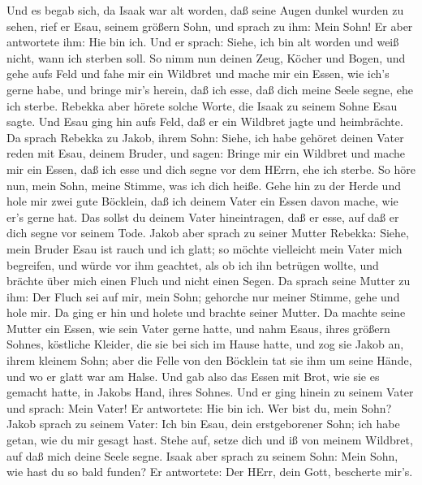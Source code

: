  Und es begab sich, da Isaak war alt worden, daß seine Augen
dunkel wurden zu sehen, rief er Esau, seinem größern Sohn, und sprach zu
ihm: Mein Sohn! Er aber antwortete ihm: Hie bin ich.  Und er
sprach: Siehe, ich bin alt worden und weiß nicht, wann ich sterben soll.
 So nimm nun deinen Zeug, Köcher und Bogen, und gehe aufs
Feld und fahe mir ein Wildbret  und mache mir ein Essen, wie
ich's gerne habe, und bringe mir's herein, daß ich esse, daß dich meine
Seele segne, ehe ich sterbe.  Rebekka aber hörete solche
Worte, die Isaak zu seinem Sohne Esau sagte. Und Esau ging hin aufs
Feld, daß er ein Wildbret jagte und heimbrächte.  Da sprach
Rebekka zu Jakob, ihrem Sohn: Siehe, ich habe gehöret deinen Vater reden
mit Esau, deinem Bruder, und sagen:  Bringe mir ein Wildbret
und mache mir ein Essen, daß ich esse und dich segne vor dem HErrn, ehe
ich sterbe.  So höre nun, mein Sohn, meine Stimme, was ich
dich heiße.  Gehe hin zu der Herde und hole mir zwei gute
Böcklein, daß ich deinem Vater ein Essen davon mache, wie er's gerne
hat.  Das sollst du deinem Vater hineintragen, daß er esse,
auf daß er dich segne vor seinem Tode.  Jakob aber sprach
zu seiner Mutter Rebekka: Siehe, mein Bruder Esau ist rauch und ich
glatt;  so möchte vielleicht mein Vater mich begreifen, und
würde vor ihm geachtet, als ob ich ihn betrügen wollte, und brächte über
mich einen Fluch und nicht einen Segen.  Da sprach seine
Mutter zu ihm: Der Fluch sei auf mir, mein Sohn; gehorche nur meiner
Stimme, gehe und hole mir.  Da ging er hin und holete und
brachte seiner Mutter. Da machte seine Mutter ein Essen, wie sein Vater
gerne hatte,  und nahm Esaus, ihres größern Sohnes,
köstliche Kleider, die sie bei sich im Hause hatte, und zog sie Jakob
an, ihrem kleinem Sohn;  aber die Felle von den Böcklein
tat sie ihm um seine Hände, und wo er glatt war am Halse. 
Und gab also das Essen mit Brot, wie sie es gemacht hatte, in Jakobs
Hand, ihres Sohnes.  Und er ging hinein zu seinem Vater und
sprach: Mein Vater! Er antwortete: Hie bin ich. Wer bist du, mein Sohn?
 Jakob sprach zu seinem Vater: Ich bin Esau, dein
erstgeborener Sohn; ich habe getan, wie du mir gesagt hast. Stehe auf,
setze dich und iß von meinem Wildbret, auf daß mich deine Seele segne.
 Isaak aber sprach zu seinem Sohn: Mein Sohn, wie hast du
so bald funden? Er antwortete: Der HErr, dein Gott, bescherte mir's.
